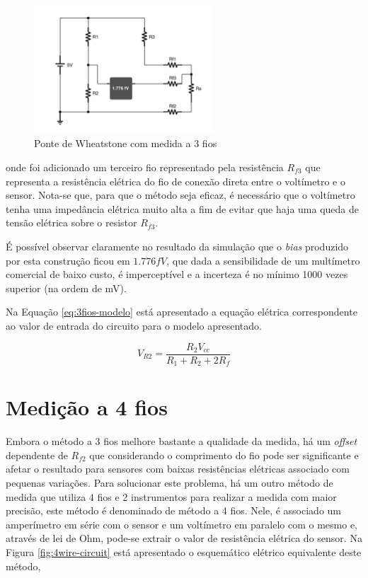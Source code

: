 \documentclass[a4paper]{instrumentacao}
\begin{document}
\begin{figure}[H]
\centering
\includegraphics[width=0.6\textwidth]{Wheatstone-Bridge-3Wire.pdf}
\caption{Ponte de Wheatstone com medida a 3 fios}
\label{fig:wheatstone-3wire}
\end{figure}

\noindent onde foi adicionado um terceiro fio representado pela resistência $R_{f3}$ que representa a resistência elétrica do fio de conexão direta entre o voltímetro e o sensor. Nota-se que, para que o método seja eficaz, é necessário que o voltímetro tenha uma impedância elétrica muito alta a fim de evitar que haja uma queda de tensão elétrica sobre o resistor $R_{f3}$.

É possível observar claramente no resultado da simulação que o \textit{bias} produzido por esta construção ficou em $1.776 fV$, que dada a sensibilidade de um multímetro comercial de baixo custo, é imperceptível e a incerteza é no mínimo 1000 vezes superior (na ordem de mV).

Na Equação \ref{eq:3fios-modelo} está apresentado a equação elétrica correspondente ao valor de entrada do circuito para o modelo apresentado.

\begin{equation}
	V_{R2} = \frac{R_2 V_{cc}}{R_1 + R_2 + 2 R_f}
	\label{eq:3fios-modelo}
\end{equation}

\section{Medição a 4 fios}

Embora o método a 3 fios melhore bastante a qualidade da medida, há um \textit{offset} dependente de $R_{f2}$ que considerando o comprimento do fio pode ser significante e afetar o resultado para sensores com baixas resistências elétricas associado com pequenas variações. Para solucionar este problema, há um outro método de medida que utiliza 4 fios e 2 instrumentos para realizar a medida com maior precisão, este método é denominado de método a 4 fios. Nele, é associado um amperímetro em série com o sensor e um voltímetro em paralelo com o mesmo e, através de lei de Ohm, pode-se extrair o valor de resistência elétrica do sensor. Na Figura \ref{fig:4wire-circuit} está apresentado o esquemático elétrico equivalente deste método,
\end{document}
